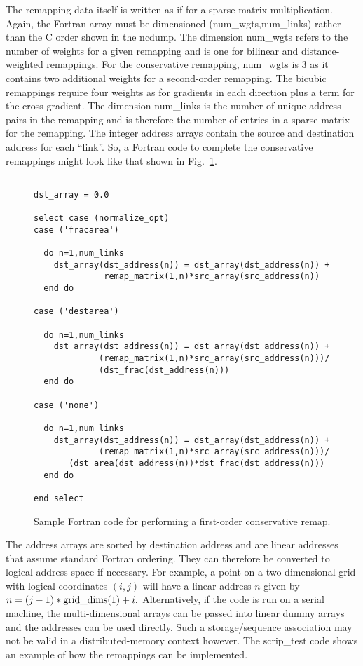 \documentclass[12pt]{report}
\begin{document}
The remapping data itself is written as if for a sparse matrix
multiplication.  Again, the Fortran array must be dimensioned
(num\_wgts,num\_links) rather than the C order shown in the
ncdump.  The dimension num\_wgts refers to the number
of weights for a given remapping and is one for bilinear and
distance-weighted remappings.  For the conservative
remapping, num\_wgts is 3 as it contains two additional
weights for a second-order remapping.  The bicubic remappings
require four weights as for gradients in each direction plus
a term for the cross gradient.  The dimension num\_links
is the number of unique address pairs in the remapping and is
therefore the number of entries in a sparse matrix for the
remapping.  The integer address arrays contain the source
and destination address for each ``link''.  So, a Fortran code
to complete the conservative remappings might look like that
shown in Fig.~\ref{fig:rmpfort}.

\begin{figure}
\caption{Sample Fortran code for performing a first-order
         conservative remap. \label{fig:rmpfort}}
\begin{verbatim}

dst_array = 0.0

select case (normalize_opt)
case ('fracarea')

  do n=1,num_links
    dst_array(dst_address(n)) = dst_array(dst_address(n)) +
              remap_matrix(1,n)*src_array(src_address(n))
  end do

case ('destarea')

  do n=1,num_links
    dst_array(dst_address(n)) = dst_array(dst_address(n)) +
             (remap_matrix(1,n)*src_array(src_address(n)))/
             (dst_frac(dst_address(n)))
  end do

case ('none')

  do n=1,num_links
    dst_array(dst_address(n)) = dst_array(dst_address(n)) +
             (remap_matrix(1,n)*src_array(src_address(n)))/
       (dst_area(dst_address(n))*dst_frac(dst_address(n)))
  end do

end select

\end{verbatim}
\end{figure}

The address arrays are sorted by destination address and are
linear addresses that assume standard
Fortran ordering. They can therefore be converted to logical
address space if necessary.  For example, a point on a
two-dimensional grid with logical coordinates $(i,j)$ will
have a linear address $n$ given by
$n=(j-1)*{\rm grid\_dims(1)} + i.$  Alternatively, if the
code is run on a serial machine, the multi-dimensional arrays
can be passed into linear dummy arrays and the addresses can
be used directly.  Such a storage/sequence association may
not be valid in a distributed-memory context however.
The scrip\_test code shows an example of how the remappings
can be implemented.
\end{document}
